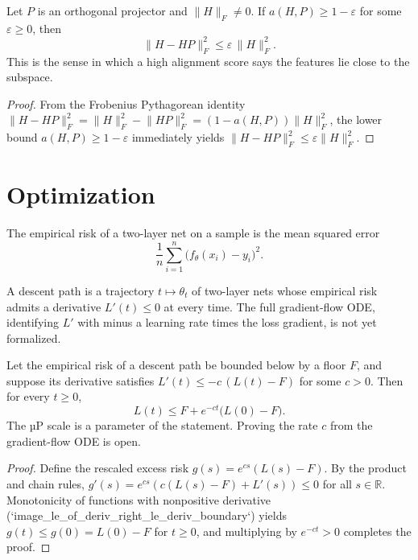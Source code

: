 \begin{lemma}\label{lem:alignment_certificate}
\leanok
{}
Let $P$ is an orthogonal projector and $\lVert H\rVert_F \ne 0$. If $a(H,P)\ge 1-\varepsilon$ for some $\varepsilon\ge 0$, then
\[
\lVert H - HP\rVert_F^2 \le \varepsilon\,\lVert H\rVert_F^2.
\]
This is the sense in which a high alignment score says the features lie close to the subspace.
\end{lemma}
\begin{proof}
\leanok
From the Frobenius Pythagorean identity $\lVert H - HP\rVert_F^2 = \lVert H\rVert_F^2 - \lVert HP\rVert_F^2 = (1 - a(H,P))\lVert H\rVert_F^2$, the lower bound $a(H,P)\ge 1-\varepsilon$ immediately yields $\lVert H - HP\rVert_F^2 \le \varepsilon \lVert H\rVert_F^2$.
\end{proof}

\chapter{Optimization}

\begin{definition}\label{def:empirical_risk}
\leanok
{}
The empirical risk of a two-layer net on a sample is the mean squared error
\[
\frac1n\sum_{i=1}^n \bigl(f_\theta(x_i)-y_i\bigr)^2.
\]
\end{definition}

\begin{definition}\label{def:descent}
\leanok
{}
A descent path is a trajectory $t\mapsto \theta_t$ of two-layer nets whose empirical risk admits a derivative $L'(t)\le 0$ at every time. The full gradient-flow ODE, identifying $L'$ with minus a learning rate times the loss gradient, is not yet formalized.
\end{definition}

\begin{lemma}\label{lem:risk_exponential}
\leanok
{}
Let the empirical risk of a descent path be bounded below by a floor $F$, and suppose its derivative satisfies $L'(t) \le -c\,(L(t)-F)$ for some $c>0$. Then for every $t\ge 0$,
\[
L(t) \le F + e^{-ct}\bigl(L(0)-F\bigr).
\]
The µP scale is a parameter of the statement. Proving the rate $c$ from the gradient-flow ODE is open.
\end{lemma}
\begin{proof}
\leanok
Define the rescaled excess risk $g(s) = e^{cs}(L(s)-F)$. By the product and chain rules, $g'(s) = e^{cs}(c(L(s)-F) + L'(s)) \le 0$ for all $s\in\mathbb{R}$. Monotonicity of functions with nonpositive derivative (`image_le_of_deriv_right_le_deriv_boundary`) yields $g(t)\le g(0) = L(0)-F$ for $t\ge 0$, and multiplying by $e^{-ct}>0$ completes the proof.
\end{proof}

